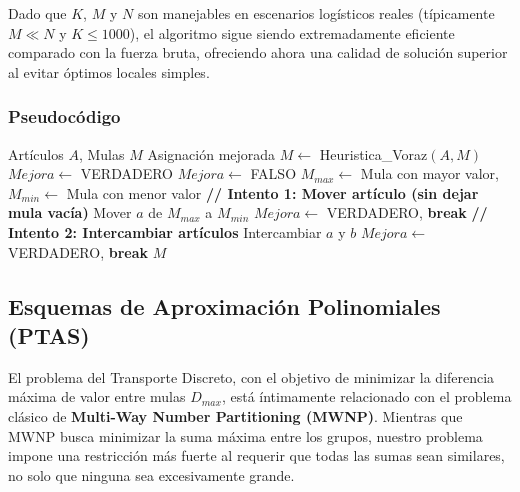 \documentclass[12pt, a4paper]{article}
\begin{document}
    Dado que $K$, $M$ y $N$ son manejables en escenarios logísticos reales (típicamente $M \ll N$ y $K \leq 1000$), el algoritmo sigue siendo extremadamente eficiente comparado con la fuerza bruta, ofreciendo ahora una calidad de solución superior al evitar óptimos locales simples.

    \subsubsection{Pseudocódigo}
    \begin{algorithm}[H]
        \caption{Búsqueda Local (Hill Climbing)}
        \begin{algorithmic}[1]
            \Require Artículos $A$, Mulas $M$
            \Ensure Asignación mejorada
            \State $M \gets$ Heuristica\_Voraz$(A, M)$
            \State $Mejora \gets$ VERDADERO
                \State $Mejora \gets$ FALSO
                \State $M_{max} \gets$ Mula con mayor valor, $M_{min} \gets$ Mula con menor valor
                \State
                \State \textbf{// Intento 1: Mover artículo (sin dejar mula vacía)}
                        \State Mover $a$ de $M_{max}$ a $M_{min}$
                        \State $Mejora \gets$ VERDADERO, \textbf{break}
                    \EndIf
                \EndFor
                \State
                \State \textbf{// Intento 2: Intercambiar artículos}
                            \State Intercambiar $a$ y $b$
                            \State $Mejora \gets$ VERDADERO, \textbf{break}
                        \EndIf
                    \EndFor
                \EndIf
            \EndWhile
            \State \Return $M$
        \end{algorithmic}
    \end{algorithm}

    \subsection{Esquemas de Aproximación Polinomiales (PTAS)}

El problema del Transporte Discreto, con el objetivo de minimizar la diferencia máxima de valor entre mulas \(D_{max}\), está íntimamente relacionado con el problema clásico de \textbf{Multi-Way Number Partitioning (MWNP)}. Mientras que MWNP busca minimizar la suma máxima entre los grupos, nuestro problema impone una restricción más fuerte al requerir que todas las sumas sean similares, no solo que ninguna sea excesivamente grande.
\end{document}
